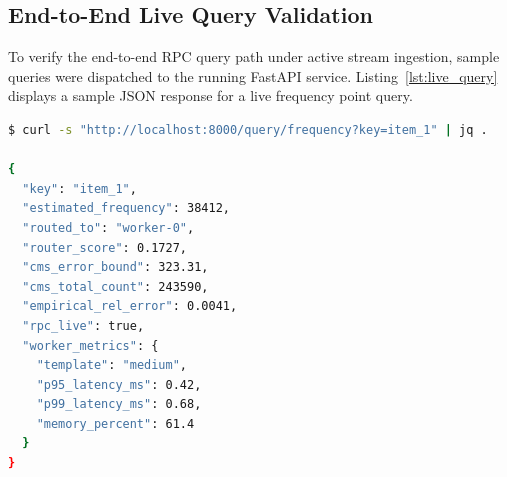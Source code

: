 \begin{table}[htbp]
\centering
{}
\caption{Automated unit testing matrix validating all Phase~1 and Phase~2 algorithmic components.}
\label{tab:test_suite}
\end{table}

\subsection{End-to-End Live Query Validation}
To verify the end-to-end RPC query path under active stream ingestion, sample queries were dispatched to the running FastAPI service. Listing~\ref{lst:live_query} displays a sample JSON response for a live frequency point query.

\begin{lstlisting}[language=bash, caption={Sample live frequency query and response payload.}, label={lst:live_query}]
$ curl -s "http://localhost:8000/query/frequency?key=item_1" | jq .

{
  "key": "item_1",
  "estimated_frequency": 38412,
  "routed_to": "worker-0",
  "router_score": 0.1727,
  "cms_error_bound": 323.31,
  "cms_total_count": 243590,
  "empirical_rel_error": 0.0041,
  "rpc_live": true,
  "worker_metrics": {
    "template": "medium",
    "p95_latency_ms": 0.42,
    "p99_latency_ms": 0.68,
    "memory_percent": 61.4
  }
}
\end{lstlisting}

